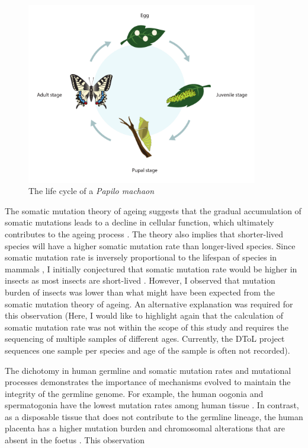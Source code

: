 \begin{figure}[h!]
\caption{The life cycle of a \textit{Papilo machaon}}
\label{figure:papilo-machaon}
\begin{centering}
\includegraphics[width=0.9\textwidth]{papilo_machaon_life_cycle.pdf} 
\end{centering}
\end{figure}

The somatic mutation theory of ageing suggests that the gradual accumulation of somatic mutations leads to a decline in cellular function, which ultimately contributes to the ageing process \cite{Szilard1959-ru}. The theory also implies that shorter-lived species will have a higher somatic mutation rate than longer-lived species. Since somatic mutation rate is inversely proportional to the lifespan of species in mammals \cite{Cagan2022-yn}, I initially conjectured that somatic mutation rate would be higher in insects as most insects are short-lived \cite{Promislow2022-en}. However, I observed that mutation burden of insects was lower than what might have been expected from the somatic mutation theory of ageing. An alternative explanation was required for this observation (Here, I would like to highlight again that the calculation of somatic mutation rate was not within the scope of this study and requires the sequencing of multiple samples of different ages. Currently, the DToL project sequences one sample per species and age of the sample is often not recorded). 

The dichotomy in human germline and somatic mutation rates and mutational processes demonstrates the importance of mechanisms evolved to maintain the integrity of the germline genome. For example, the human oogonia and spermatogonia have the lowest mutation rates among human tissue \cite{Rahbari2016-ot}. In contrast, as a disposable tissue that does not contribute to the germline lineage, the human placenta has a higher mutation burden and chromosomal alterations that are absent in the foetus \cite{Coorens2021-ct}. This observation 

